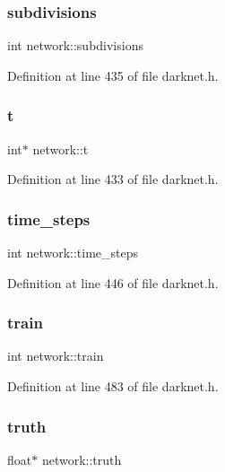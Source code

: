 \subsubsection{\texorpdfstring{subdivisions}{subdivisions}}
{\footnotesize\ttfamily int network\+::subdivisions}



Definition at line 435 of file darknet.\+h.

\mbox{\label{structnetwork_a185b52d74237f3cd32d2d0186d2d2f5b}} 
\subsubsection{\texorpdfstring{t}{t}}
{\footnotesize\ttfamily int$\ast$ network\+::t}



Definition at line 433 of file darknet.\+h.

\mbox{\label{structnetwork_abaf83235b5968fb68a2dc9215cc67c8c}} 
\subsubsection{\texorpdfstring{time\_steps}{time\_steps}}
{\footnotesize\ttfamily int network\+::time\+\_\+steps}



Definition at line 446 of file darknet.\+h.

\mbox{\label{structnetwork_a32e7b55fe8dfa07391b6cdce17b4a2c1}} 
\subsubsection{\texorpdfstring{train}{train}}
{\footnotesize\ttfamily int network\+::train}



Definition at line 483 of file darknet.\+h.

\mbox{\label{structnetwork_a1453c2cf9a735bde55a281d698797a05}} 
\subsubsection{\texorpdfstring{truth}{truth}}
{\footnotesize\ttfamily float$\ast$ network\+::truth}



